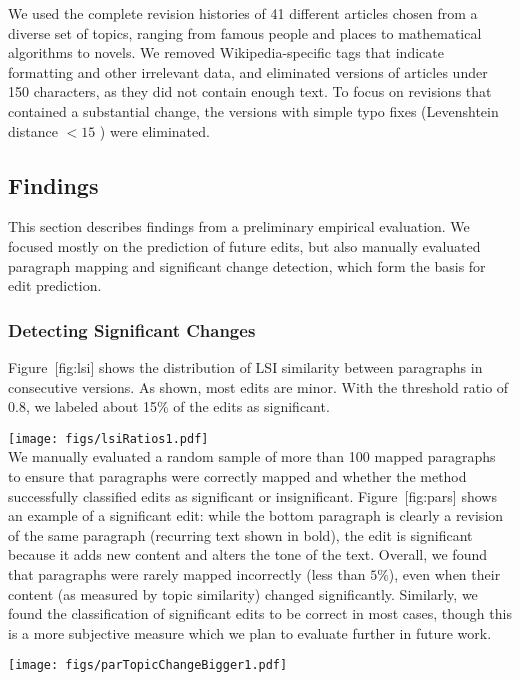 We used the complete revision histories of 41 different articles chosen
from a diverse set of topics, ranging from famous people and places to
mathematical algorithms to novels. We removed Wikipedia-specific tags
that indicate formatting and other irrelevant data, and eliminated
versions of articles under 150 characters, as they did not contain
enough text. To focus on revisions that contained a substantial change,
the versions with simple typo fixes (Levenshtein distance \(< 15\) )
were eliminated.

\subsection{Findings}\label{findings}

This section describes findings from a preliminary empirical evaluation.
We focused mostly on the prediction of future edits, but also manually
evaluated paragraph mapping and significant change detection, which form
the basis for edit prediction.

\subsubsection{Detecting Significant
Changes}\label{detecting-significant-changes}

Figure~{[}fig:lsi{]} shows the distribution of LSI similarity between
paragraphs in consecutive versions. As shown, most edits are minor. With
the threshold ratio of 0.8, we labeled about 15\% of the edits as
significant.

\texttt{[image: figs/lsiRatios1.pdf]}\\

We manually evaluated a random sample of more than 100 mapped paragraphs
to ensure that paragraphs were correctly mapped and whether the method
successfully classified edits as significant or insignificant.
Figure~{[}fig:pars{]} shows an example of a significant edit: while the
bottom paragraph is clearly a revision of the same paragraph (recurring
text shown in bold), the edit is significant because it adds new content
and alters the tone of the text. Overall, we found that paragraphs were
rarely mapped incorrectly (less than \(5\%\)), even when their content
(as measured by topic similarity) changed significantly. Similarly, we
found the classification of significant edits to be correct in most
cases, though this is a more subjective measure which we plan to
evaluate further in future work.

\texttt{[image: figs/parTopicChangeBigger1.pdf]}\\

